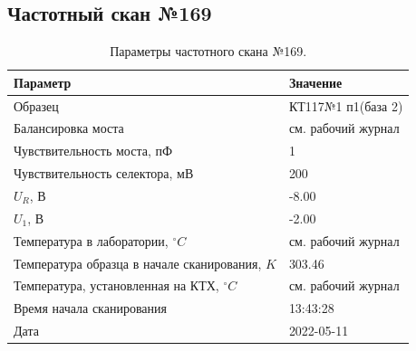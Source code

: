 \subsection{Частотный скан №169}
\begin{table}[!ht]
    \centering
    \caption{Параметры частотного скана №169.}
    \begin{tabular}{|l|l|}
        \hline
        Параметр                                       & Значение                  \\ \hline
        Образец                                        & КТ117№1 п1(база 2)        \\ \hline
        Балансировка моста                             & см. рабочий журнал        \\ \hline
        Чувствительность моста, пФ                     & 1                         \\ \hline
        Чувствительность селектора, мВ                 & 200                       \\ \hline
        $U_R$, В                                       & -8.00                     \\ \hline
        $U_1$, В                                       & -2.00                     \\ \hline
        Температура в лаборатории, $^\circ C$          & см. рабочий журнал        \\ \hline
        Температура образца в начале сканирования, $K$ & 303.46                    \\ \hline
        Температура, установленная на КТХ, $^\circ C$  & см. рабочий журнал        \\ \hline
        Время начала сканирования                      & 13:43:28                  \\ \hline
        Дата                                           & 2022-05-11                \\ \hline
    \end{tabular}
    \label{table:frequency_scan_169}
\end{table}

